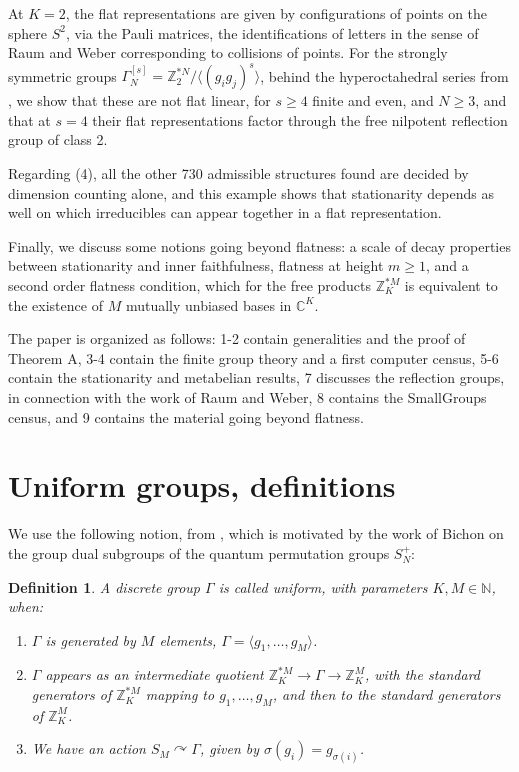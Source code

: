 \documentclass[12pt]{amsart}
\newtheorem{definition}[theorem]{Definition}
\theoremstyle{definition}
\begin{document}
At $K=2$, the flat representations are given by configurations of points on the sphere $S^2$, via the Pauli matrices, the identifications of letters in the sense of Raum and Weber corresponding to collisions of points. For the strongly symmetric groups $\Gamma_N^{[s]}=\mathbb Z_2^{*N}/\langle(g_ig_j)^s\rangle$, behind the hyperoctahedral series from \cite{rw2}, we show that these are not flat linear, for $s\geq4$ finite and even, and $N\geq3$, and that at $s=4$ their flat representations factor through the free nilpotent reflection group of class 2.

Regarding (4), all the other 730 admissible structures found are decided by dimension counting alone, and this example shows that stationarity depends as well on which irreducibles can appear together in a flat representation.

Finally, we discuss some notions going beyond flatness: a scale of decay properties between stationarity and inner faithfulness, flatness at height $m\geq1$, and a second order flatness condition, which for the free products $\mathbb Z_K^{*M}$ is equivalent to the existence of $M$ mutually unbiased bases in $\mathbb C^K$.

The paper is organized as follows: 1-2 contain generalities and the proof of Theorem A, 3-4 contain the finite group theory and a first computer census, 5-6 contain the stationarity and metabelian results, 7 discusses the reflection groups, in connection with the work of Raum and Weber, 8 contains the SmallGroups census, and 9 contains the material going beyond flatness.

\section{Uniform groups, definitions}

We use the following notion, from \cite{bc1,bc2}, which is motivated by the work of Bichon \cite{bic} on the group dual subgroups of the quantum permutation groups $S_N^+$:

\begin{definition}
A discrete group $\Gamma$ is called uniform, with parameters $K,M\in\mathbb N$, when:
\begin{enumerate}
\item $\Gamma$ is generated by $M$ elements, $\Gamma=\langle g_1,\ldots,g_M\rangle$.

\item $\Gamma$ appears as an intermediate quotient $\mathbb Z_K^{*M}\to\Gamma\to\mathbb Z_K^M$, with the standard generators of $\mathbb Z_K^{*M}$ mapping to $g_1,\ldots,g_M$, and then to the standard generators of $\mathbb Z_K^M$.

\item We have an action $S_M\curvearrowright\Gamma$, given by $\sigma(g_i)=g_{\sigma(i)}$.
\end{enumerate}
\end{definition}
\end{document}
